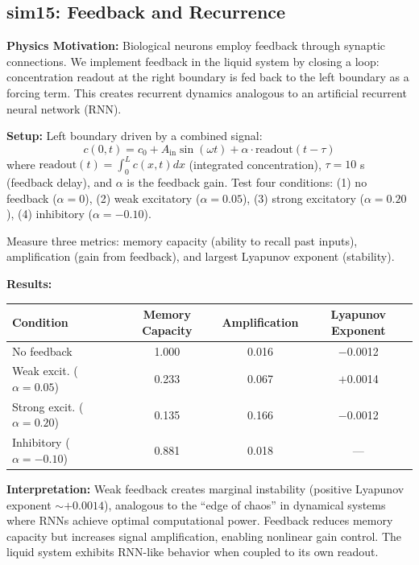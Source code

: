 \documentclass[11pt]{article}
\begin{document}
\subsection{sim15: Feedback and Recurrence}

\textbf{Physics Motivation:} Biological neurons employ feedback through synaptic connections. We implement feedback in the liquid system by closing a loop: concentration readout at the right boundary is fed back to the left boundary as a forcing term. This creates recurrent dynamics analogous to an artificial recurrent neural network (RNN).

\textbf{Setup:} Left boundary driven by a combined signal:
\begin{equation}
c(0, t) = c_0 + A_{\text{in}} \sin(\omega t) + \alpha \cdot \text{readout}(t - \tau)
\end{equation}
where $\text{readout}(t) = \int_0^L c(x,t) dx$ (integrated concentration), $\tau = 10$ s (feedback delay), and $\alpha$ is the feedback gain. Test four conditions: (1) no feedback ($\alpha = 0$), (2) weak excitatory ($\alpha = 0.05$), (3) strong excitatory ($\alpha = 0.20$), (4) inhibitory ($\alpha = -0.10$).

Measure three metrics: memory capacity (ability to recall past inputs), amplification (gain from feedback), and largest Lyapunov exponent (stability).

\textbf{Results:}
\begin{center}
\begin{tabular}{|l|ccc|}
\hline
Condition & Memory Capacity & Amplification & Lyapunov Exponent \\
\hline
No feedback & 1.000 & 0.016 & $-$0.0012 \\
Weak excit. ($\alpha=0.05$) & 0.233 & 0.067 & $+$0.0014 \\
Strong excit. ($\alpha=0.20$) & 0.135 & 0.166 & $-$0.0012 \\
Inhibitory ($\alpha=-0.10$) & 0.881 & 0.018 & — \\
\hline
\end{tabular}
\end{center}

\textbf{Interpretation:} Weak feedback creates marginal instability (positive Lyapunov exponent $\sim +0.0014$), analogous to the ``edge of chaos'' in dynamical systems where RNNs achieve optimal computational power. Feedback reduces memory capacity but increases signal amplification, enabling nonlinear gain control. The liquid system exhibits RNN-like behavior when coupled to its own readout.
\end{document}
